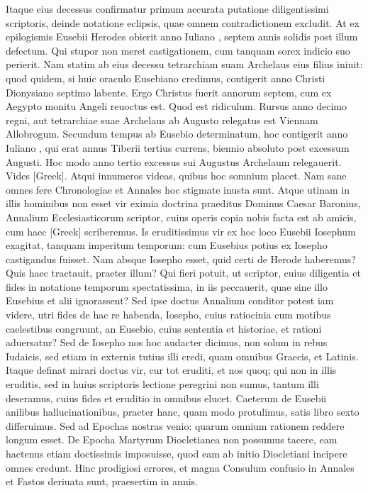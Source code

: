 Itaque eius decessus confirmatur primum accurata putatione
diligentissimi scriptoris, deinde notatione eclipsis, quae omnem contradictionem
excludit.
At ex epilogismis Eusebii Herodes obierit
anno Iuliano , septem annis solidis post illum defectum.
Qui stupor non meret castigationem, cum tanquam sorex indicio
 suo perierit.
Nam statim ab eius decessu tetrarchiam suam Archelaus eius filius
iniuit: quod quidem, si huic oraculo Eusebiano credimus, contigerit
anno Christi Dionysiano septimo labente.
Ergo Christus fuerit
annorum septem, cum ex Aegypto monitu Angeli reuoctus est.
Quod est ridiculum.
Rursus anno decimo regni, aut tetrarchiae suae
Archelaus ab Augusto relegatus est Viennam Allobrogum.
Secundum tempus ab Eusebio determinatum, hoc contigerit anno Iuliano
, qui erat annus Tiberii tertius currens, biennio absoluto
post excessum Augusti.
Hoc modo anno tertio excessus sui Augustus
Archelaum relegauerit.
Vides \textgreek{[Greek]}.
Atqui innumeros videas,
quibus hoc somnium placet.
Nam sane omnes fere Chronologiae
et Annales hoc stigmate inusta sunt.
Atque utinam in illis hominibus
non esset vir eximia doctrina praeditus Dominus Caesar Baronius,
Annalium Ecclesiasticorum scriptor, cuius operis copia nobis
facta est ab amicis, cum haec \textgreek{[Greek]} scriberemus.
Is eruditissimus
vir ex hoc loco Eusebii Iosephum exagitat, tanquam imperitum
temporum: cum Eusebius potius ex Iosepho castigandus fuisset.
Nam absque Iosepho esset, quid certi de Herode haberemus?
Quis haec tractauit, praeter illum?
Qui fieri potuit, ut scriptor, cuius diligentia
et fides in notatione temporum spectatissima, in iis peccauerit,
quae sine illo Eusebius et alii ignorassent?
Sed ipse doctus Annalium
conditor potest iam videre, utri fides de hac re habenda, Iosepho,
cuius ratiocinia cum motibus caelestibus congruunt, an Eusebio,
cuius sententia et historiae, et rationi aduersatur?
Sed de Iosepho
nos hoc audacter dicimus, non solum in rebus Iudaicis, sed etiam
in externis tutius illi credi, quam omnibus Graecis, et Latinis.
Itaque
definat mirari doctus vir, cur tot eruditi, et nos quoq; qui non in illis
eruditis, sed in huius scriptoris lectione peregrini non sumus, tantum
illi deseramus, cuius fides et eruditio in omnibus elucet.
Caeterum de Eusebii anilibus hallucinationibus, praeter hanc, quam
modo protulimus, satis libro sexto differuimus.
Sed ad Epochas
nostras venio: quarum omnium rationem reddere longum esset.
De Epocha Martyrum Diocletianea non possumus tacere, eam hactenus
etiam doctissimis imposuisse, quod eam ab initio Diocletiani
incipere omnes credunt.
Hinc prodigiosi errores, et magna Consulum
confusio in Annales et Fastos deriuata sunt, praesertim in annis.

